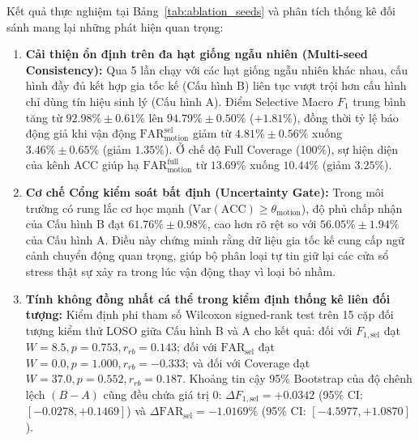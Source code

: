 \documentclass[conference]{IEEEtran}
\begin{document}
Kết quả thực nghiệm tại Bảng~\ref{tab:ablation_seeds} và phân tích thống kê đối sánh mang lại những phát hiện quan trọng:
\begin{enumerate}
    \item \textbf{Cải thiện ổn định trên đa hạt giống ngẫu nhiên (Multi-seed Consistency):} Qua 5 lần chạy với các hạt giống ngẫu nhiên khác nhau, cấu hình đầy đủ kết hợp gia tốc kế (Cấu hình B) liên tục vượt trội hơn cấu hình chỉ dùng tín hiệu sinh lý (Cấu hình A). Điểm Selective Macro $F_1$ trung bình tăng từ $92.98\% \pm 0.61\%$ lên $94.79\% \pm 0.50\%$ ($+1.81\%$), đồng thời tỷ lệ báo động giả khi vận động $\text{FAR}_{\text{motion}}^{\text{sel}}$ giảm từ $4.81\% \pm 0.56\%$ xuống $3.46\% \pm 0.65\%$ (giảm $1.35\%$). Ở chế độ Full Coverage (100\%), sự hiện diện của kênh ACC giúp hạ $\text{FAR}_{\text{motion}}^{\text{full}}$ từ $13.69\%$ xuống $10.44\%$ (giảm $3.25\%$).
    \item \textbf{Cơ chế Cổng kiểm soát bất định (Uncertainty Gate):} Trong môi trường có rung lắc cơ học mạnh ($\text{Var}(\text{ACC}) \ge \theta_{\text{motion}}$), độ phủ chấp nhận của Cấu hình B đạt $61.76\% \pm 0.98\%$, cao hơn rõ rệt so với $56.05\% \pm 1.94\%$ của Cấu hình A. Điều này chứng minh rằng dữ liệu gia tốc kế cung cấp ngữ cảnh chuyển động quan trọng, giúp bộ phân loại tự tin giữ lại các cửa sổ stress thật sự xảy ra trong lúc vận động thay vì loại bỏ nhầm.
    \item \textbf{Tính không đồng nhất cá thể trong kiểm định thống kê liên đối tượng:} Kiểm định phi tham số Wilcoxon signed-rank test trên 15 cặp đối tượng kiểm thử LOSO giữa Cấu hình B và A cho kết quả: đối với $F_{1,\text{sel}}$ đạt $W = 8.5, p = 0.753, r_{rb} = 0.143$; đối với $\text{FAR}_{\text{sel}}$ đạt $W = 0.0, p = 1.000, r_{rb} = -0.333$; và đối với Coverage đạt $W = 37.0, p = 0.552, r_{rb} = 0.187$. Khoảng tin cậy 95\% Bootstrap của độ chênh lệch $(B - A)$ cũng đều chứa giá trị 0: $\Delta F_{1,\text{sel}} = +0.0342$ (95\% CI: $[-0.0278, +0.1469]$) và $\Delta \text{FAR}_{\text{sel}} = -1.0169\%$ (95\% CI: $[-4.5977, +1.0870]$). 


\end{enumerate}
\end{document}
